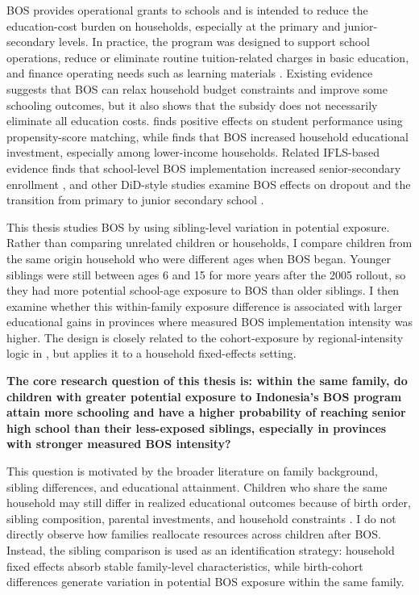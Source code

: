 \documentclass[a4paper, 12pt]{article}
\begin{document}
\begin{doublespacing}
BOS provides operational grants to schools and is intended to reduce the education-cost burden on households, especially at the primary and junior-secondary levels. In practice, the program was designed to support school operations, reduce or eliminate routine tuition-related charges in basic education, and finance operating needs such as learning materials \citep{WorldBank2008,UNESCOIIEPUNICEF2016}. Existing evidence suggests that BOS can relax household budget constraints and improve some schooling outcomes, but it also shows that the subsidy does not necessarily eliminate all education costs. \citet{Sulistyaningrum2016} finds positive effects on student performance using propensity-score matching, while \citet{SariTanaka2019} finds that BOS increased household educational investment, especially among lower-income households. Related IFLS-based evidence finds that school-level BOS implementation increased senior-secondary enrollment \citep{KartasasmitaSulistyaningrum2021}, and other DiD-style studies examine BOS effects on dropout and the transition from primary to junior secondary school \citep{Kharisma2018,KharismaRemiMaharani2021}.

This thesis studies BOS by using sibling-level variation in potential exposure. Rather than comparing unrelated children or households, I compare children from the same origin household who were different ages when BOS began. Younger siblings were still between ages 6 and 15 for more years after the 2005 rollout, so they had more potential school-age exposure to BOS than older siblings. I then examine whether this within-family exposure difference is associated with larger educational gains in provinces where measured BOS implementation intensity was higher. The design is closely related to the cohort-exposure by regional-intensity logic in \citet{Duflo2001}, but applies it to a household fixed-effects setting.

\textbf{The core research question of this thesis is: within the same family, do children with greater potential exposure to Indonesia's BOS program attain more schooling and have a higher probability of reaching senior high school than their less-exposed siblings, especially in provinces with stronger measured BOS intensity?}

This question is motivated by the broader literature on family background, sibling differences, and educational attainment. Children who share the same household may still differ in realized educational outcomes because of birth order, sibling composition, parental investments, and household constraints \citep{BlackDevereuxSalvanes2005,NicolettiRabe2019,FerreiraSandholtz2024}. I do not directly observe how families reallocate resources across children after BOS. Instead, the sibling comparison is used as an identification strategy: household fixed effects absorb stable family-level characteristics, while birth-cohort differences generate variation in potential BOS exposure within the same family.


\end{doublespacing}
\end{document}
